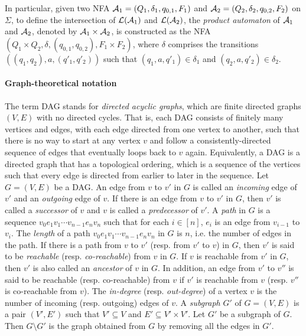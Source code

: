 In particular, given two NFA $\mathcal{A}_1=(Q_1, \delta_1, q_{0,1}, F_1)$ and $\mathcal{A}_2=(Q_2, \delta_2, q_{0,2}, F_2)$ on $\Sigma$, to define the intersection of $\mathcal{L}(\mathcal{A}_1)$ and $\mathcal{L}(\mathcal{A}_2)$, the \emph{product automaton} of $\mathcal{A}_1$ and $\mathcal{A}_2$, denoted by $\mathcal{A}_1 \times \mathcal{A}_2$, is constructed as the NFA $(Q_1 \times Q_2, \delta, (q_{0,1}, q_{0,2}), F_1 \times F_2)$, where $\delta$ comprises the transitions $((q_1, q_2), a, (q'_1, q'_2))$ such that $(q_1, a, q'_1) \in \delta_1$ and $(q_2, a, q'_2) \in \delta_2$.  

\paragraph{Graph-theoretical notation}
The term DAG stands for \emph{directed acyclic graphs}, which are finite directed graphs $(V, E)$ with no directed cycles. That is, each DAG consists of finitely many vertices and edges, with each edge directed from one vertex to another, such that there is no way to start at any vertex $\mathit{v}$ and follow a consistently-directed sequence of edges that eventually loops back to $\mathit{v}$ again. Equivalently, a DAG is a directed graph that has a topological ordering, which is a sequence of the vertices such that every edge is directed from earlier to later in the sequence. Let $G=(V,E)$ be a DAG. An edge from $\mathit{v}$ to $\mathit{v'}$ in $G$ is called an \emph{incoming} edge of $\mathit{v'}$ and an \emph{outgoing} edge of $\mathit{v}$. If there is an edge from $\mathit{v}$ to $\mathit{v'}$ in $G$, then $\mathit{v'}$ is called a \emph{successor} of $\mathit{v}$ and $\mathit{v}$ is called a \emph{predecessor} of $\mathit{v'}$. A \emph{path} in $G$ is a sequence $\mathit{v}_0 \mathit{e}_1 \mathit{v}_1 \cdots \mathit{v}_{n-1} \mathit{e}_n \mathit{v}_n$ such that for each $i \in [n]$, $e_i$ is an edge from $\mathit{v}_{i-1}$ to $\mathit{v}_i$. The \emph{length} of a path $\mathit{v}_0 e_1 \mathit{v}_1 \cdots \mathit{v}_{n-1} e_n \mathit{v}_n$ in $G$ is $n$, i.e. the number of edges in the path. If there is a path from $\mathit{v}$ to $\mathit{v'}$ (resp. from $\mathit{v'}$ to $\mathit{v}$) in $G$, then $\mathit{v'}$ is said to be \emph{reachable} (resp. \emph{co-reachable}) from $\mathit{v}$ in $G$. If $\mathit{v}$ is reachable from $\mathit{v'}$ in $G$, then $\mathit{v'}$ is also called an \emph{ancestor} of $\mathit{v}$ in $G$. In addition, an edge from $\mathit{v'}$ to $\mathit{v''}$ is said to be reachable (resp. co-reachable) from $\mathit{v}$ if $\mathit{v'}$ is reachable from $\mathit{v}$ (resp. $\mathit{v''}$ is co-reachable from $\mathit{v}$). The \emph{in-degree} (resp. \emph{out-degree}) of a vertex $\mathit{v}$ is the number of incoming (resp. outgoing) edges of $\mathit{v}$. 
A \emph{subgraph} $G'$ of $G=(V,E)$ is a pair $(V', E')$ such that $V' \subseteq V$ and $E' \subseteq V' \times V'$. Let $G'$ be a subgraph of $G$. Then $G \setminus G'$ is the graph obtained from $G$ by removing all the edges in $G'$. 


